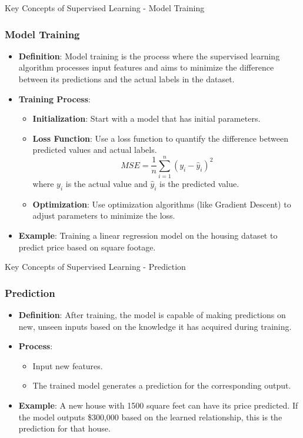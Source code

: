 \documentclass[aspectratio=169]{beamer}
\begin{document}
\begin{frame}[fragile]{Key Concepts of Supervised Learning - Model Training}
    \frametitle{Model Training}
    \begin{itemize}
        \item \textbf{Definition}: Model training is the process where the supervised learning algorithm 
        processes input features and aims to minimize the difference between its predictions and the actual 
        labels in the dataset.
        \item \textbf{Training Process}:
        \begin{itemize}
            \item \textbf{Initialization}: Start with a model that has initial parameters.
            \item \textbf{Loss Function}: Use a loss function to quantify the difference between predicted 
            values and actual labels.
            \begin{equation}
            MSE = \frac{1}{n}\sum_{i=1}^{n}(y_i - \hat{y}_i)^2
            \end{equation}
            where \(y_i\) is the actual value and \(\hat{y}_i\) is the predicted value.
            \item \textbf{Optimization}: Use optimization algorithms (like Gradient Descent) to adjust 
            parameters to minimize the loss.
        \end{itemize}
        \item \textbf{Example}: Training a linear regression model on the housing dataset to predict price 
        based on square footage.
    \end{itemize}
\end{frame}

\begin{frame}[fragile]{Key Concepts of Supervised Learning - Prediction}
    \frametitle{Prediction}
    \begin{itemize}
        \item \textbf{Definition}: After training, the model is capable of making predictions on 
        new, unseen inputs based on the knowledge it has acquired during training.
        \item \textbf{Process}:
        \begin{itemize}
            \item Input new features.
            \item The trained model generates a prediction for the corresponding output.
        \end{itemize}
        \item \textbf{Example}: A new house with 1500 square feet can have its price predicted. If the 
        model outputs \$300,000 based on the learned relationship, this is the prediction for that house.
    \end{itemize}
\end{frame}
\end{document}
